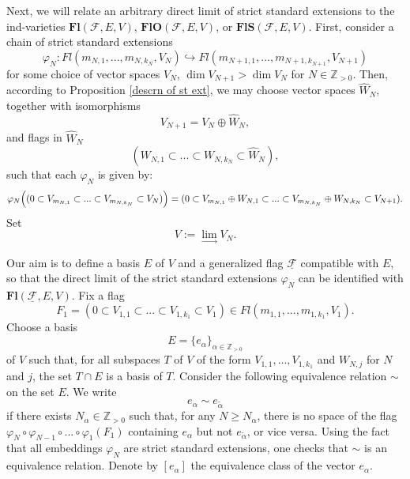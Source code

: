 \documentclass[12pt]{amsart}
\renewcommand{\phi}{\varphi}
\theoremstyle{definition}
\begin{document}
Next, we will relate an arbitrary direct limit of strict
standard extensions to the ind-varieties $\mathbf{Fl}
(\mathcal{F},E,V)$, $\mathbf{FlO}(\mathcal{F},E,V)$, or
$\mathbf{FlS}(\mathcal{F},E,V)$. First, consider a chain of 
strict standard extensions
\begin{equation}\label{phi_n's}
\phi_N:Fl(m_{N,1},..., m_{N,k_N},V_N)\hookrightarrow Fl(
m_{N+1,1},...,m_{N+1,k_{N+1}},V_{N+1}) 
\end{equation}
for some choice of vector spaces $V_N$, $\dim V_{N+1}>\dim V_N$
for $N\in\mathbb{Z}_{>0}$. Then, according to Proposition 
\ref{descrn of st ext}, we may choose vector spaces 
$\widehat{W}_N$, together with isomorphisms
\begin{equation*}\label{Vn in Vn+1}
V_{N+1}=V_N\oplus \widehat{W}_N,
\end{equation*} 
and flags in $\widehat{W}_N$
\begin{equation*}\label{flag for n}
(W_{N,1}\subset...\subset W_{N,k_N}\subset\widehat{W}_N),
\end{equation*}
such that each $\phi_N$ is given by:
\begin{equation*}\label{descr of phi n's}
\phi_N\Big((0\subset V_{m_{N,1}}\subset...
\subset V_{m_{N,k_N}}\subset V_N)\Big)=\\
(0\subset V_{m_{N,1}}\oplus W_{N,1}\subset ...\subset V_{m_{N,k_N}}\oplus W_{N,k_N}\subset
V_{N+1}).
\end{equation*}
Set
\begin{equation*}\label{V=lim Vn}
V:=\underset{\to}\lim V_N. 
\end{equation*} 

Our aim is to define a basis $E$ of $V$ and a generalized flag
$\mathcal{\underline{F}}$ compatible with $E$,  so that the
direct limit of the strict standard extensions $\phi_N$ can be
identified with $\mathbf{Fl}(\mathcal{\underline{F}},E,V)$. 
Fix a flag $$F_1=(0\subset V_{1,1}\subset...\subset V_{1,k_1} 
\subset V_1)\in Fl(m_{1,1},...,m_{1,k_1},V_1).$$ Choose a basis 
\begin{equation*}\label{basis E}
E=\{e_{\alpha}\}_{\alpha\in\mathbb{Z}_{>0}}
\end{equation*} 
of $V$ such that, for all subspaces $T$ of $V$ of the form 
$V_{1,1},...,V_{1,k_1}$ and $W_{N,j}$ for $N$ and $j$, the 
set $T\cap E$ is a basis of $T$. Consider the following 
equivalence relation $\sim$ on the set $E$. We write 
\begin{equation*}\label{equiv}
e_{\alpha}\sim e_{\tilde{\alpha}}
\end{equation*}
if there exists $N_{\alpha}\in\mathbb{Z}_{>0}$ such that, for 
any $N\ge N_{\alpha}$, there is no space of the flag 
$\phi_N\circ\phi_{N-1}\circ...\circ\phi_1(F_1)$ containing 
$e_{\alpha}$ but not $e_{\tilde{\alpha}}$, or vice versa.
Using the fact that all embeddings $\phi_N$ are strict 
standard extensions, one checks that $\sim$ is an equivalence 
relation. Denote by $[e_{\alpha}]$ the equivalence class of 
the vector $e_{\alpha}$. 
\end{document}
